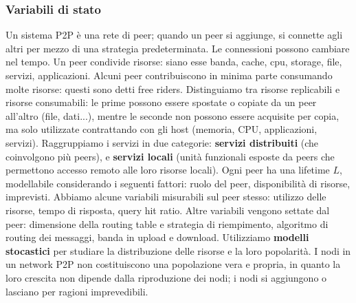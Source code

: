 \documentclass[11pt]{article}
\begin{document}
\subsubsection{Variabili di stato}
Un sistema P2P è una rete di peer; quando un peer si aggiunge, si connette agli altri per mezzo di una strategia predeterminata. Le connessioni possono cambiare nel tempo. Un peer condivide risorse: siano esse banda, cache, cpu, storage, file, servizi, applicazioni. Alcuni peer contribuiscono in minima parte consumando molte risorse: questi sono detti free riders. Distinguiamo tra risorse replicabili e risorse consumabili: le prime possono essere spostate o copiate da un peer all'altro (file, dati...), mentre le seconde non possono essere acquisite per copia, ma solo utilizzate contrattando con gli host (memoria, CPU, applicazioni, servizi). 
Raggruppiamo i servizi in due categorie: \textbf{servizi distribuiti} (che coinvolgono più peers), e \textbf{servizi locali} (unità funzionali esposte da peers che permettono accesso remoto alle loro risorse locali). 
Ogni peer ha una lifetime $L$, modellabile considerando i seguenti fattori: ruolo del peer, disponibilità di risorse, imprevisti. Abbiamo alcune variabili misurabili sul peer stesso: utilizzo delle risorse, tempo di risposta, query hit ratio. Altre variabili vengono settate dal peer: dimensione della routing table e strategia di riempimento, algoritmo di routing dei messaggi, banda in upload e download. 
Utilizziamo \textbf{modelli stocastici} per studiare la distribuzione delle risorse e la loro popolarità. 
I nodi in un network P2P non costituiscono una popolazione vera e propria, in quanto la loro crescita non dipende dalla riproduzione dei nodi; i nodi si aggiungono o lasciano per ragioni imprevedibili. 
\end{document}
